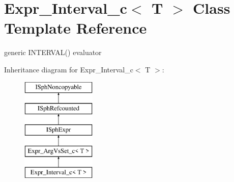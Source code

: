 \hypertarget{classExpr__Interval__c}{\section{Expr\-\_\-\-Interval\-\_\-c$<$ T $>$ Class Template Reference}
\label{classExpr__Interval__c}
}


generic I\-N\-T\-E\-R\-V\-A\-L() evaluator  


Inheritance diagram for Expr\-\_\-\-Interval\-\_\-c$<$ T $>$\-:\begin{figure}[H]
\begin{center}
\leavevmode
\includegraphics[height=5.000000cm]{classExpr__Interval__c}
\end{center}
\end{figure}
